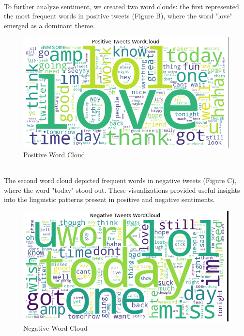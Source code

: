 \documentclass[conference]{IEEEtran}
\begin{document}
\\
To further analyze sentiment, we created two word clouds: the first represented the most frequent words in positive tweets (Figure B),
 where the word "love" emerged as a dominant theme.
 \begin{figure}[H]
        \centering
        \includegraphics[width=\linewidth]{assets/PositiveWorldCloud.png}
        \caption{Positive Word Cloud}
        \label{fig:PositiveWordCloud}
    \end{figure} 
    \\
    The second word cloud depicted frequent words in negative tweets (Figure C), where the word "today" stood out. 
 These visualizations provided useful insights into the linguistic patterns present in positive and negative sentiments.
 \begin{figure}[H]
        \centering
        \includegraphics[width=\linewidth]{assets/NegativeWordCloud.png}
        \caption{Negative Word Cloud}
        \label{fig:NegativeWordCloud}
    \end{figure}
 \\
\end{document}
